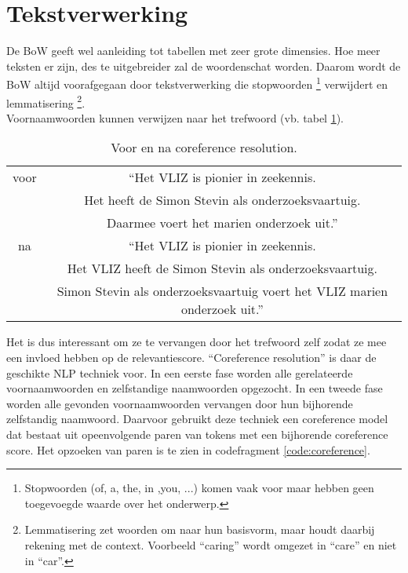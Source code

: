 \section{Tekstverwerking}
De BoW geeft wel aanleiding tot tabellen met zeer grote dimensies. Hoe meer teksten er zijn, des te uitgebreider zal de woordenschat worden. Daarom wordt de BoW altijd voorafgegaan door tekstverwerking die stopwoorden \footnote{Stopwoorden (of, a, the, in ,you, ...) komen vaak voor maar hebben geen toegevoegde waarde over het onderwerp.} verwijdert en lemmatisering \footnote{Lemmatisering zet woorden om naar hun basisvorm, maar houdt daarbij rekening met de context. Voorbeeld ``caring'' wordt omgezet in ``care'' en niet in ``car''.}.\\
Voornaamwoorden kunnen verwijzen naar het trefwoord 
(vb. tabel \ref{table:nlp}).
\begin{table}[h!]
    \centering
    \begin{tabular}{|c|c|} 
        \hline
        voor&``Het VLIZ is pionier in zeekennis.\\&Het heeft de Simon Stevin als onderzoeksvaartuig.\\&Daarmee voert het marien onderzoek uit.''\\
        \hline
        na&``Het VLIZ is pionier in zeekennis.\\&Het VLIZ heeft de Simon Stevin als onderzoeksvaartuig.\\&Simon Stevin als onderzoeksvaartuig voert het VLIZ marien onderzoek uit.''\\
        \hline
    \end{tabular}
    \caption{Voor en na coreference resolution.}
    \label{table:nlp}
\end{table}
Het is dus interessant om ze te vervangen door het trefwoord zelf zodat ze mee een invloed hebben op de relevantiescore. ``Coreference resolution'' is daar de geschikte NLP techniek voor. In een eerste fase worden alle gerelateerde voornaamwoorden en zelfstandige naamwoorden opgezocht. In een tweede fase worden alle gevonden voornaamwoorden vervangen door hun bijhorende zelfstandig naamwoord. Daarvoor gebruikt deze techniek een coreference model dat bestaat uit opeenvolgende paren van tokens met een bijhorende coreference score.
Het opzoeken van paren is te zien in codefragment \ref{code:coreference}.
